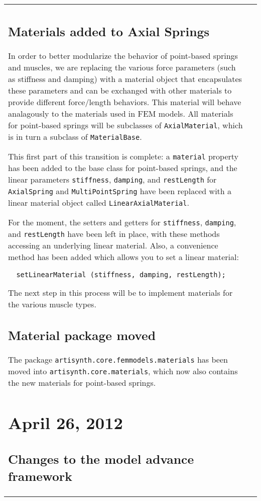 \documentclass{article}
\begin{document}
\begin{tabular}{ll}
\subsection*{Materials added to Axial Springs}

In order to better modularize the behavior of point-based springs and
muscles, we are replacing the various force parameters (such as
stiffness and damping) with a material object that encapsulates these
parameters and can be exchanged with other materials to provide
different force/length behaviors. This material will behave
analagously to the materials used in FEM models. All materials for
point-based springs will be subclasses of {\tt AxialMaterial}, which is in
turn a subclass of {\tt MaterialBase}.

This first part of this transition is complete: a {\tt material} property
has been added to the base class for point-based springs, and the
linear parameters {\tt stiffness}, {\tt damping}, and {\tt restLength} for
{\tt AxialSpring} and {\tt MultiPointSpring} have been replaced with a linear
material object called {\tt LinearAxialMaterial}.

For the moment, the setters and getters for {\tt stiffness}, {\tt damping},
and {\tt restLength} have been left in place, with these methods accessing
an underlying linear material. Also, a convenience method has been
added which allows you to set a linear material:

\begin{verbatim}
  setLinearMaterial (stiffness, damping, restLength);
\end{verbatim}

The next step in this process will be to implement materials for the
various muscle types.

\subsection*{Material package moved}

The package {\tt artisynth.core.femmodels.materials} has been moved into
{\tt artisynth.core.materials}, which now also contains the new materials for
point-based springs.

\section*{April 26, 2012}

\subsection*{Changes to the model advance framework}


\end{tabular}
\end{document}
